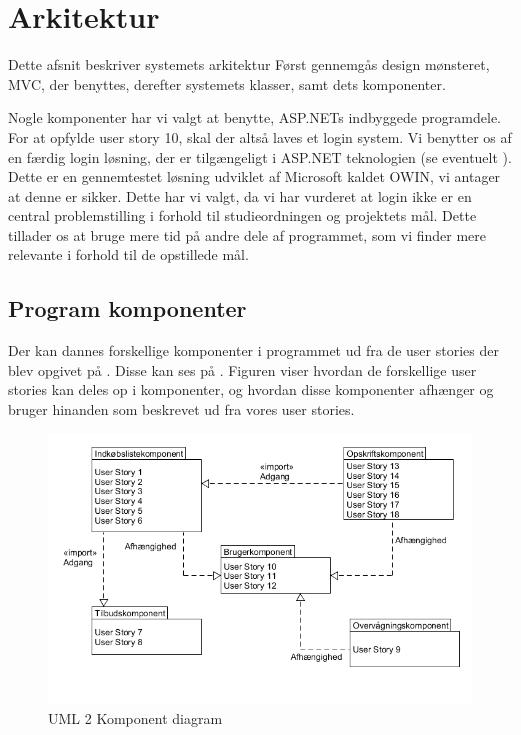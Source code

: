 \section{Arkitektur}
Dette afsnit beskriver systemets arkitektur
Først gennemgås design mønsteret, MVC, der benyttes, derefter systemets klasser, samt dets komponenter.

Nogle komponenter har vi valgt at benytte, ASP.NETs indbyggede programdele. 
For at opfylde user story 10, skal der altså laves et login system.
Vi benytter os af en færdig login løsning, der er tilgængeligt i ASP.NET teknologien (se eventuelt ).
Dette er en gennemtestet løsning udviklet af Microsoft kaldet OWIN, vi antager at denne er sikker.
Dette har vi valgt, da vi har vurderet at login ikke er en central problemstilling i forhold til studieordningen og projektets mål.
Dette tillader os at bruge mere tid på andre dele af programmet, som vi finder mere relevante i forhold til de opstillede mål.



\subsection{Program komponenter}\label{subsec:komp}

Der kan dannes forskellige komponenter i programmet ud fra de user stories der blev opgivet på .
Disse kan ses på .
Figuren viser hvordan de forskellige user stories kan deles op i komponenter, og hvordan disse komponenter afhænger og bruger hinanden som beskrevet ud fra vores user stories.

\begin{figure}
	\vspace{-20pt}
	\begin{center}
		\includegraphics[scale=0.6]{images/Diagrams/Komponenter.png}
	\end{center}
	\vspace{-20pt}
	\caption{UML 2 Komponent diagram }
	\label{figure:komp}
	\vspace{-20pt}
\end{figure}

